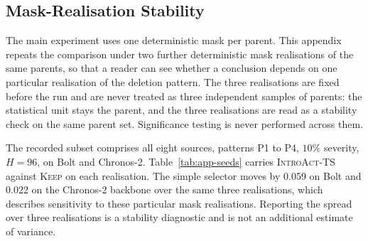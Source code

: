\documentclass{article}
\newcommand{\introact}{\textsc{IntroAct-TS}}
\begin{document}
\subsection{Mask-Realisation Stability}
\label{app:seeds}
The main experiment uses one deterministic mask per parent. This appendix repeats the
comparison under two further deterministic mask realisations of the same parents, so that a
reader can see whether a conclusion depends on one particular realisation of the deletion
pattern. The three realisations are fixed before the run and are never treated as three
independent samples of parents: the statistical unit stays the parent, and the three
realisations are read as a stability check on the same parent set. Significance testing is
never performed across them.

The recorded subset comprises all eight sources, patterns P1 to P4, $10\%$ severity,
$H=96$, on Bolt and Chronos-2. Table~\ref{tab:app-seeds} carries \introact{} against
\textsc{Keep} on each realisation. The simple selector moves by 0.059 on
Bolt and 0.022 on the Chronos-2 backbone over the same three realisations,
which describes sensitivity to these particular mask realisations. Reporting the spread over three
realisations is a stability diagnostic and is not an additional estimate of variance.

\begin{table}[htbp]
  \caption{Mask-realisation stability. Each row is one deterministic mask realisation on the
  pre-registered subset. The spread across realisations is a stability diagnostic and is not
  an additional sample of parents.}
  \label{tab:app-seeds}
  \centering
  \small
  \setlength{\tabcolsep}{4pt}
\end{table}
\end{document}
